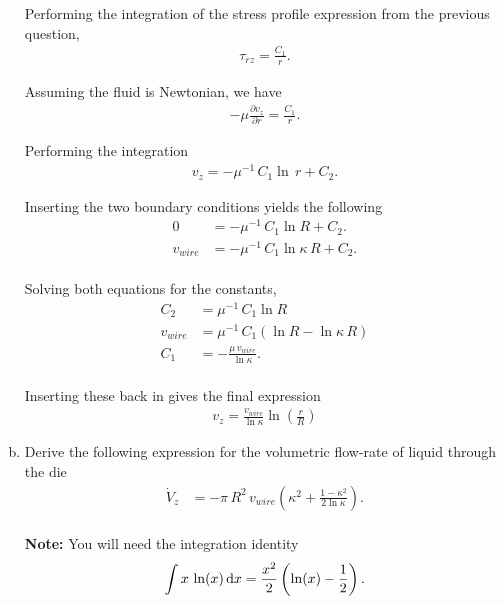\documentclass[calculator,datasheet,handbook,solutions]{exam}
\begin{document}
\begin{question}
\begin{enumerate}[a)]
{      Performing the integration of the stress profile expression from
      the previous question,
      \begin{align*}
        \tau_{rz} = \frac{C_1}{r}.
      \end{align*}
      
      Assuming the fluid is Newtonian, we have
      \begin{align*}
        -\mu \frac{\partial v_z}{\partial r} = \frac{C_1}{r}.
      \end{align*}

      Performing the integration
      \begin{align*}
        v_z = -\mu^{-1}\,C_1\ln\,r+C_2.
      \end{align*}
      
      Inserting the two boundary conditions yields the following
      \begin{align*}
        0 &= -\mu^{-1}\,C_1\ln R+C_2.\\
        v_{wire} &= -\mu^{-1}\,C_1\ln \kappa\,R+C_2.\\
      \end{align*}

      Solving both equations for the constants,
      \begin{align*}
        C_2 &= \mu^{-1}\,C_1\ln R\\
        v_{wire} &= \mu^{-1}\,C_1(\ln R-\ln \kappa\,R)\\
        C_1 &= -\frac{\mu\,v_{wire}}{\ln \kappa}.\\
      \end{align*}

      Inserting these back in gives the final expression
      \begin{align*}
        v_z = \frac{v_{wire}}{\ln \kappa}\ln\left(\frac{r}{R}\right)
      \end{align*}
    } 
  \item Derive the following expression for the volumetric flow-rate of liquid
    through the die
    \begin{align*}
      \dot{V}_z &= -\pi\,R^2\,v_{wire}\left({\kappa^2}+\frac{1-\kappa^2}{2\ln \kappa}\right).
    \end{align*}
    \\{\bf Note:} You will need the integration identity
    \begin{align*}
      \int x\,\ln(x)\,{\rm d}x = \frac{x^2}{2}\left(\ln(x) - \frac{1}{2}\right).
    \end{align*}
\end{enumerate}
\end{question}
\end{document}
